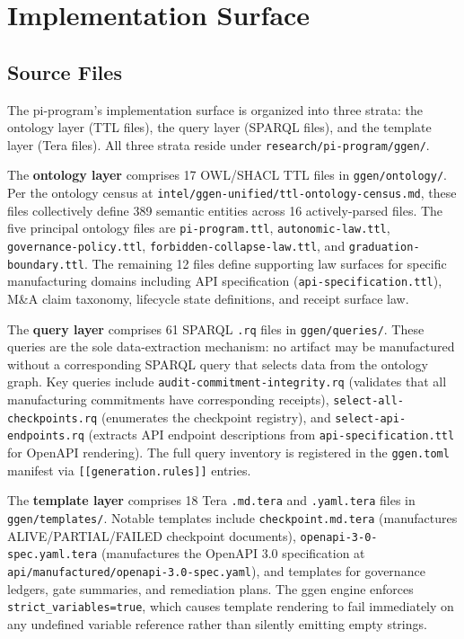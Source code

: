 
\section{Implementation Surface}
\label{sec:research-pi-program-impl}

\subsection{Source Files}
\label{sec:research-pi-program-impl-sources}

The pi-program's implementation surface is organized into three strata: the ontology layer (TTL files), the query layer (SPARQL files), and the template layer (Tera files). All three strata reside under \texttt{research/pi-program/ggen/}.

The \textbf{ontology layer} comprises 17 OWL/SHACL TTL files in \texttt{ggen/ontology/}. Per the ontology census at \texttt{intel/ggen-unified/ttl-ontology-census.md}, these files collectively define 389 semantic entities across 16 actively-parsed files. The five principal ontology files are \texttt{pi-program.ttl}, \texttt{autonomic-law.ttl}, \texttt{governance-policy.ttl}, \texttt{forbidden-collapse-law.ttl}, and \texttt{graduation-boundary.ttl}. The remaining 12 files define supporting law surfaces for specific manufacturing domains including API specification (\texttt{api-specification.ttl}), M\&A claim taxonomy, lifecycle state definitions, and receipt surface law.

The \textbf{query layer} comprises 61 SPARQL \texttt{.rq} files in \texttt{ggen/queries/}. These queries are the sole data-extraction mechanism: no artifact may be manufactured without a corresponding SPARQL query that selects data from the ontology graph. Key queries include \texttt{audit-commitment-integrity.rq} (validates that all manufacturing commitments have corresponding receipts), \texttt{select-all-checkpoints.rq} (enumerates the checkpoint registry), and \texttt{select-api-endpoints.rq} (extracts API endpoint descriptions from \texttt{api-specification.ttl} for OpenAPI rendering). The full query inventory is registered in the \texttt{ggen.toml} manifest via \texttt{[[generation.rules]]} entries.

The \textbf{template layer} comprises 18 Tera \texttt{.md.tera} and \texttt{.yaml.tera} files in \texttt{ggen/templates/}. Notable templates include \texttt{checkpoint.md.tera} (manufactures ALIVE/PARTIAL/FAILED checkpoint documents), \texttt{openapi-3-0-spec.yaml.tera} (manufactures the OpenAPI 3.0 specification at \texttt{api/manufactured/openapi-3.0-spec.yaml}), and templates for governance ledgers, gate summaries, and remediation plans. The ggen engine enforces \texttt{strict\_variables=true}, which causes template rendering to fail immediately on any undefined variable reference rather than silently emitting empty strings.

